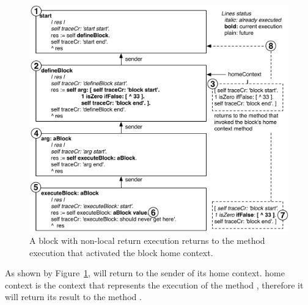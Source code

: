 \documentclass[a4paper,10pt,twoside]{book}
\begin{document}
\begin{figure}
\begin{center}\includegraphics[width=\textwidth]{nonLocalReturn2}
\caption{A block with non-local return execution returns to the method execution that activated the block home context.\label{nonLocalReturn}}
\end{center}
\end{figure}

As shown by Figure~\ref{nonLocalReturn}, \ct{[^33]} will return to the sender of its home context. \ct{[^33]} home context is the context that represents the execution of the method , therefore it will return its result to the method .
\end{document}
